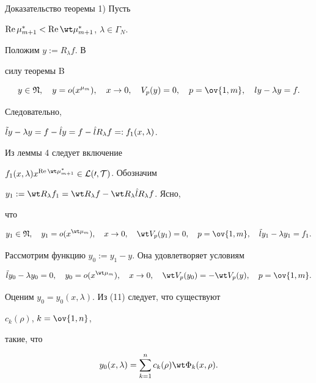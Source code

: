 \begin{pf*}{Доказательство теоремы} 1) Пусть


$\re\mu^*_{m+1}<\re\wt\mu^*_{m+1}$, $\lambda\in\Gamma_N$.


Положим $y:=R_\lambda f$. В


силу теоремы B


$$


y\in\frak N,\quad y=o(x^{\mu_m}),\quad x\to 0,\quad


V_p(y)=0,\quad p=\ov{1,m},\quad ly-\lambda y=f.


$$


Следовательно,


$\Tilde ly-\lambda y=f-\Hat ly=f-\Hat l R_\lambda f=:f_1(x,\lambda)$.





Из леммы 4 следует включение


$f_1(x,\lambda)x^{\re\wt\mu^*_{m+1}}\in\cal L(0,T)$. Обозначим


$y_1:=\wt R_\lambda f_1=\wt R_\lambda f-\wt R_\lambda\Hat l


R_\lambda f$. Ясно,


что


$$


y_1\in\frak N,\quad y_1=o(x^{\wt\mu_m}),\quad x\to 0,\quad


\wt V_p(y_1)=0,\quad


p=\ov{1,m},\quad \Tilde ly_1-\lambda y_1=f_1.


$$





Рассмотрим функцию $y_0:=y_1-y$. Она удовлетворяет условиям


\begin{equation}


\Tilde ly_0-\lambda y_0=0,\quad y_0=o(x^{\wt\mu_m}),\quad


x\to 0,\quad \wt V_p(y_0)=-\wt V_p(y),\quad


p=\ov{1,m}.


\end{equation}


Оценим $y_0=y_0(x,\lambda)$. Из (11) следует, что существуют


$c_k(\rho)$, $k=\ov{1,n}$,


такие, что


$$


y_0(x,\lambda)=\sum^n_{k=1}c_k(\rho)\wt\Phi_k(x,\rho).


$$



\end{pf*}
